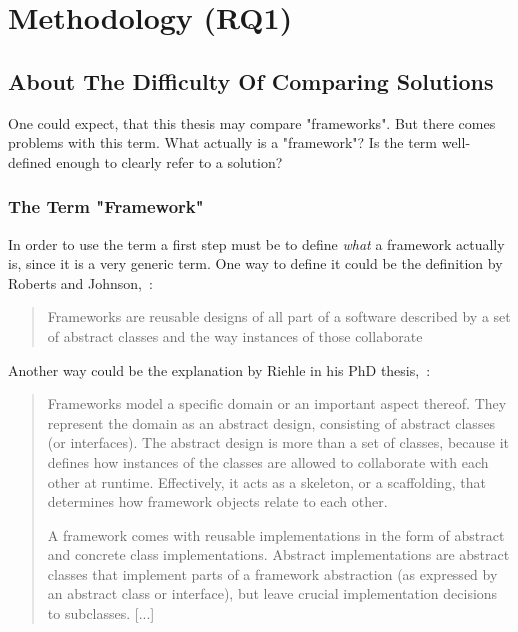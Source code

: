 \chapter{Methodology (RQ1)}\label{chap:methodology}
\section{About The Difficulty Of Comparing Solutions}\label{def:framework}

One could expect, that this thesis may compare "frameworks". But there comes problems with this term. What actually is a "framework"? Is the term well-defined enough to clearly refer to a solution?

\subsection{The Term "Framework"}

In order to use the term a first step must be to define \emph{what} a framework actually is, since it is a very generic term. One way to define it could be the definition by Roberts and Johnson,~\cite{roberts1996evolving}:

\begin{quotation}
Frameworks are reusable designs of all part of a software described by a set of abstract classes and the way instances of those collaborate
\end{quotation}

Another way could be the explanation by Riehle in his PhD thesis,~\cite{riehle2000framework}:

\begin{quotation}
Frameworks model a specific domain or an important aspect thereof. They represent the domain as an abstract design, consisting of abstract classes (or interfaces). The abstract design is more than a set of classes, because it defines how instances of the classes are allowed to collaborate with each other at runtime. Effectively, it acts as a skeleton, or a scaffolding, that determines how framework objects relate to each other.

A framework comes with reusable implementations in the form of abstract and concrete class implementations. Abstract implementations are abstract classes that implement parts of a framework abstraction (as expressed by an abstract class or interface), but leave crucial implementation decisions to subclasses. [...]
\end{quotation}

